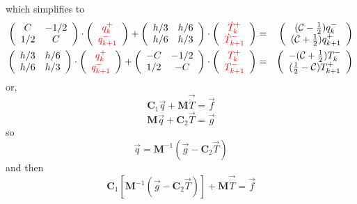 which simplifies to 
\begin{eqnarray}
\left(
\begin{array}{cc}
C  & -1/2 \\
1/2 & C 
\end{array}
\right)
\cdot 
\left( 
\begin{array}{cc}
    {\color{red}q_k^+}  \\
    {\color{red}q_{k+1}^-}
\end{array}
\right)
+
\left(
\begin{array}{cc}
h/3 & h/6 \\
h/6 & h/3
\end{array}
\right)
\cdot 
\left(
\begin{array}{c}
{\color{red}\dot{T}_k^+}  \\
{\color{red}\dot{T}_{k+1}^-} 
\end{array}
\right) 
&=& 
\left(
\begin{array}{cc}
     ({\cal C}-\frac{1}{2}) q_k^-  \\
     ({\cal C}+\frac{1}{2}) q_{k+1}^+ 
\end{array}
\right)
\nonumber
\\
\left(
\begin{array}{cc}
h/3 & h/6 \\
h/6 & h/3
\end{array}
\right)
\cdot
\left(
\begin{array}{cc}
    {\color{red}q_k^+}  \\
    {\color{red}q_{k+1}^-}
\end{array}
\right)+
\left(
\begin{array}{cc}
-C  & -1/2 \\
1/2 & -C
\end{array}
\right)
\cdot
\left(
\begin{array}{cc}
 {\color{red}T_k^+}  \\
{\color{red}T_{k+1}^-} 
\end{array}
\right) 
&=& \left(
\begin{array}{cc}
     -({\cal C}+\frac{1}{2})  T_k^- \\
     (\frac{1}{2}-{\cal C})  T_{k+1}^+ 
\end{array}
\right) 
\end{eqnarray}
or, 
\[
{\bm C}_1 \vec{q} +  {\bm M} \vec{\dot{T}} = \vec{f}  
\]
\[
{\bm M} \vec{q} + {\bm C}_2 \vec{T} = \vec{g}
\]
so 
\[
 \vec{q} = {\bm M}^{-1}   (\vec{g} -  {\bm C}_2 \vec{T} )
\]
and then 
\[
{\bm C}_1 [  {\bm M}^{-1}   (\vec{g} -  {\bm C}_2 \vec{T} )   ]    +  {\bm M} \vec{\dot{T}} = \vec{f}  
\]


